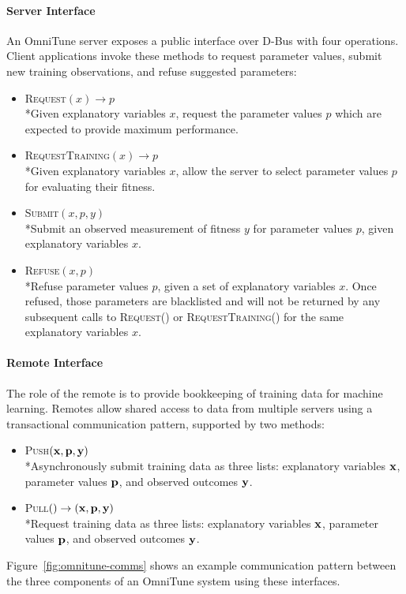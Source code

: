 \documentclass[nonatbib,preprint,9pt]{sigplanconf}
\begin{document}
\paragraph{Server Interface} An OmniTune server exposes a public
interface over D-Bus with four operations. Client applications invoke
these methods to request parameter values, submit new training
observations, and refuse suggested parameters:
%
\begin{itemize}
\item \textsc{Request}$(x) \to p$\\*Given explanatory variables $x$,
  request the parameter values $p$ which are expected to provide
  maximum performance.
\item \textsc{RequestTraining}$(x) \to p$\\*Given explanatory
  variables $x$, allow the server to select parameter values $p$ for
  evaluating their fitness.
\item \textsc{Submit}$(x, p, y)$\\*Submit an observed measurement of
  fitness $y$ for parameter values $p$, given explanatory variables
  $x$.
\item \textsc{Refuse}$(x, p)$\\*Refuse parameter values $p$, given a
  set of explanatory variables $x$. Once refused, those parameters are
  blacklisted and will not be returned by any subsequent calls to
  \textsc{Request()} or \textsc{RequestTraining()} for the same
  explanatory variables $x$.
\end{itemize}
%

\paragraph{Remote Interface} The role of the remote is to provide
bookkeeping of training data for machine learning. Remotes allow
shared access to data from multiple servers using a transactional
communication pattern, supported by two methods:
%
\begin{itemize}
\item \textsc{Push}$(\bf{x}, \bf{p}, \bf{y})$\\*Asynchronously submit
  training data as three lists: explanatory variables $\bf{x}$,
  parameter values $\bf{p}$, and observed outcomes $\bf{y}$.
\item \textsc{Pull}$() \to (\bf{x}, \bf{p}, \bf{y})$\\*Request
  training data as three lists: explanatory variables $\bf{x}$,
  parameter values $\bf{p}$, and observed outcomes $\bf{y}$.
\end{itemize}
%
Figure~\ref{fig:omnitune-comms} shows an example communication pattern
between the three components of an OmniTune system using these
interfaces.
\end{document}
